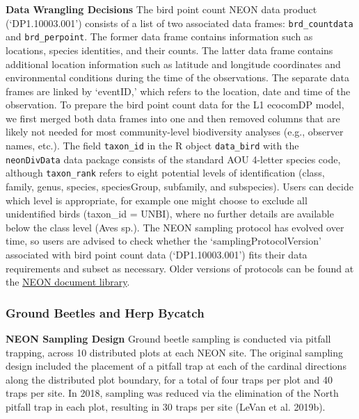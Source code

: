 \documentclass[
  12pt,
]{article}
\begin{document}
\textbf{Data Wrangling Decisions} The bird point count NEON data product (`DP1.10003.001') consists of a list of two associated data frames: \texttt{brd\_countdata} and \texttt{brd\_perpoint}. The former data frame contains information such as locations, species identities, and their counts. The latter data frame contains additional location information such as latitude and longitude coordinates and environmental conditions during the time of the observations. The separate data frames are linked by `eventID,' which refers to the location, date and time of the observation. To prepare the bird point count data for the L1 ecocomDP model, we first merged both data frames into one and then removed columns that are likely not needed for most community-level biodiversity analyses (e.g., observer names, etc.). The field \texttt{taxon\_id} in the R object \texttt{data\_bird} with the \texttt{neonDivData} data package consists of the standard AOU 4-letter species code, although \texttt{taxon\_rank} refers to eight potential levels of identification (class, family, genus, species, speciesGroup, subfamily, and subspecies). Users can decide which level is appropriate, for example one might choose to exclude all unidentified birds (taxon\_id = UNBI), where no further details are available below the class level (Aves sp.). The NEON sampling protocol has evolved over time, so users are advised to check whether the `samplingProtocolVersion' associated with bird point count data (`DP1.10003.001') fits their data requirements and subset as necessary. Older versions of protocols can be found at the \href{https://data.neonscience.org/documents/-/document_library_display/JEygRkSpUBoq/view/1883155?_110_INSTANCE_JEygRkSpUBoq_topLink=home\&_110_INSTANCE_JEygRkSpUBoq_delta1=20\&_110_INSTANCE_JEygRkSpUBoq_keywords=\&_110_INSTANCE_JEygRkSpUBoq_advancedSearch=false\&_110_INSTANCE_JEygRkSpUBoq_andOperator=true\&p_r_p_564233524_resetCur=false\&_110_INSTANCE_JEygRkSpUBoq_delta2=20\&_110_INSTANCE_JEygRkSpUBoq_cur2=1}{NEON document library}.

\hypertarget{ground-beetles-and-herp-bycatch}{%
\subsubsection{Ground Beetles and Herp Bycatch}\label{ground-beetles-and-herp-bycatch}}

\textbf{NEON Sampling Design} Ground beetle sampling is conducted via pitfall trapping, across 10 distributed plots at each NEON site. The original sampling design included the placement of a pitfall trap at each of the cardinal directions along the distributed plot boundary, for a total of four traps per plot and 40 traps per site. In 2018, sampling was reduced via the elimination of the North pitfall trap in each plot, resulting in 30 traps per site (LeVan et al. 2019b).
\end{document}

